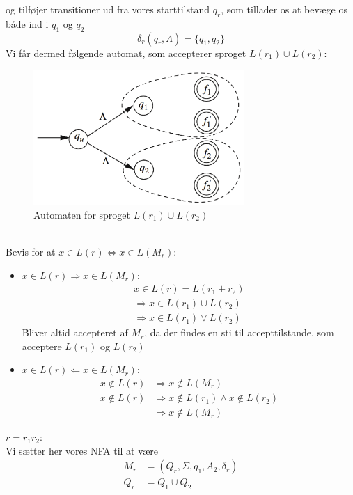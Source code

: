 \documentclass[a4, danish]{article}
\begin{document}
    og tilføjer transitioner ud fra vores starttilstand $q_r$, som tillader os at bevæge os både ind i  $q_1$ og $q_2$
    \begin{equation*}
      \delta_r(q_r,\Lambda)=\{q_1,q_2\}
    \end{equation*}
    Vi får dermed følgende automat, som accepterer sproget $L(r_1)\cup L(r_2)$:
    \begin{figure}[ht!]
  	  \centering
  	  \includegraphics[width=80mm]{img/Kleene13.png}
  	  \caption{Automaten for sproget $L(r_1)\cup L(r_2)$	\label{KleeneInd1}}
    \end{figure}
    \\
    Bevis for at $x \in L(r) \Leftrightarrow x \in L(M_r)$:
    \begin{itemize}
    	\item  $x \in L(r) \Rightarrow x \in L(M_r) $: 
      \begin{align*}
        x \in L(r) = L(r_1+r_2) \\
        \Rightarrow x \in L(r_1) \cup L(r_2) \\
        \Rightarrow x \in L(r_1) \lor L(r_2) 
      \end{align*}
      Bliver altid accepteret af $M_r$, da der findes en sti til accepttilstande, som acceptere $L(r_1)$ og $L(r_2)$       
      \item  $x \in L(r) \Leftarrow x \in L(M_r) $: 
      \begin{align*}
        x \notin L(r) &\Rightarrow x \notin L(M_r) \\
        x \notin L(r) &\Rightarrow x \notin L(r_1) \land x \notin L(r_2) \\
        &\Rightarrow x \notin L(M_r)
      \end{align*}
    \end{itemize}
    $r=r_1r_2$:\\
    Vi sætter her vores NFA til at være 
    \begin{align*}
      M_r&=(Q_r,\Sigma,q_1,A_2,\delta_r)\\
      Q_r&=Q_1\cup Q_2 
    \end{align*}
\end{document}

